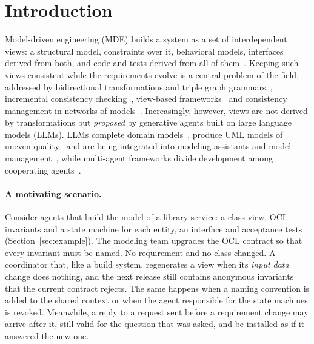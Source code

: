 \documentclass[pdflatex,sn-mathphys-num]{sn-jnl}
\theoremstyle{thmstyleone}%
\theoremstyle{thmstyletwo}%
\theoremstyle{thmstylethree}%
\begin{document}
\maketitle

\section{Introduction}\label{sec:intro}
Model-driven engineering (MDE) builds a system as a set of interdependent views: a structural model, constraints over it, behavioral models, interfaces derived from both, and code and tests derived from all of them~\cite{cicchetti2019multiview}. Keeping such views consistent while the requirements evolve is a central problem of the field, addressed by bidirectional transformations and triple graph grammars~\cite{czarnecki2009bx,giese2009tgg,hermann2015tgg}, incremental consistency checking~\cite{egyed2006instant,egyed2011inconsistencies,varro2016viatra}, view-based frameworks~\cite{atkinson2010osm,klare2021vitruvius} and consistency management in networks of models~\cite{stevens,stevens2020megamodels}. Increasingly, however, views are not derived by transformations but \emph{proposed} by generative agents built on large language models (LLMs). LLMs complete domain models~\cite{chaaben2023completion}, produce UML models of uneven quality~\cite{camara2023chatgpt} and are being integrated into modeling assistants and model management~\cite{mussbacher2020assistance,dirocco2025llmmde}, while multi-agent frameworks divide development among cooperating agents~\cite{metagpt,he2025mas}.

\paragraph{A motivating scenario.} Consider agents that build the model of a library service: a class view, OCL invariants and a state machine for each entity, an interface and acceptance tests (Section~\ref{sec:example}). The modeling team upgrades the OCL contract so that every invariant must be named. No requirement and no class changed. A coordinator that, like a build system, regenerates a view when its \emph{input data} change does nothing, and the next release still contains anonymous invariants that the current contract rejects. The same happens when a naming convention is added to the shared context or when the agent responsible for the state machines is revoked. Meanwhile, a reply to a request sent before a requirement change may arrive after it, still valid for the question that was asked, and be installed as if it answered the new one.
\end{document}
